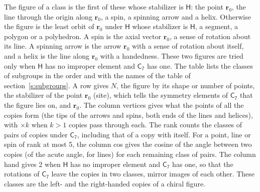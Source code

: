 \documentclass[10pt,a4paper]{article}
\numberwithin{equation}{section}
\newcommand{\grp}[1]{\mathsf{#1}}
\newcommand{\pointr}{\mathbf{r}}
\begin{document}
\leavevmode\label{n:head.figure}The figure of a class is the first of these whose stabilizer is $\grp{H}$: the point $\pointr_0$, the line through the origin along $\pointr_0$, a spin, a spinning arrow and a helix. Otherwise the figure is the least orbit of $\pointr_0$ under $\grp{H}$ whose stabilizer is $\grp{H}$, a segment, a polygon or a polyhedron. A spin is the axial vector $\pointr_0$, a sense of rotation about its line. A spinning arrow is the arrow $\pointr_0$ with a sense of rotation about itself, and a helix is the line along $\pointr_0$ with a handedness. These two figures are tried only when $\grp{H}$ has no improper element and $\grp{C_{7}}$ has one. The table lists the classes of subgroups in the order and with the names of the table of section~\ref{s:subgroups}. \label{n:head.site}A row gives $N$, the figure by its shape or number of points, the stabilizer of the point $\pointr_0$ (site), which tells the symmetry elements of $\grp{C_{7}}$ that the figure lies on, and $\pointr_0$. \label{n:head.vertices}The column vertices gives what the points of all the copies form (the tips of the arrows and spins, both ends of the lines and helices), with ${\times}k$ when $k > 1$ copies pass through each. \label{n:head.rank}The rank counts the classes of pairs of copies under $\grp{C_{7}}$, including that of a copy with itself. \label{n:head.cos}For a point, line or spin of rank at most 5, the column cos gives the cosine of the angle between two copies (of the acute angle, for lines) for each remaining class of pairs. \label{n:head.hand}The column hand gives 2 when $\grp{H}$ has no improper element and $\grp{C_{7}}$ has one, so that the rotations of $\grp{C_{7}}$ leave the copies in two classes, mirror images of each other. These classes are the left- and the right-handed copies of a chiral figure.
\end{document}
